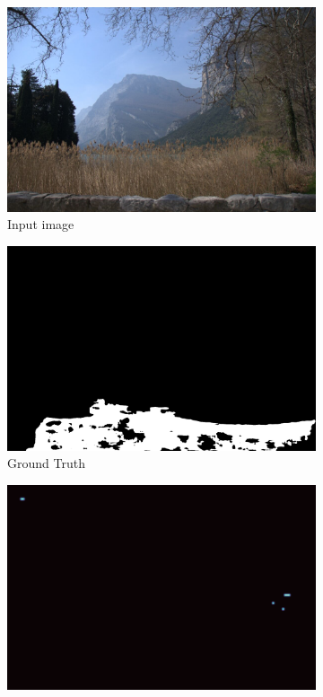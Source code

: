 \documentclass{ipol}
\begin{document}
\begin{figure}[ht]
        \begin{subfigure}[t]{.235\linewidth}
                \includegraphics[width=\linewidth]{images/aahd_dcb/image.jpeg}
                \caption{Input image}
        \end{subfigure}\hfill%
        \begin{subfigure}[t]{.235\linewidth}
                \includegraphics[width=\linewidth]{images/aahd_dcb/mask_a.png}
                \caption{Ground Truth}
        \end{subfigure}\hfill%
        \begin{subfigure}[t]{.235\linewidth}
                \includegraphics[width=\linewidth]{images/aahd_dcb/out_inconsistent_diag_thr_fig.png}

\end{subfigure}
\end{figure}
\end{document}
